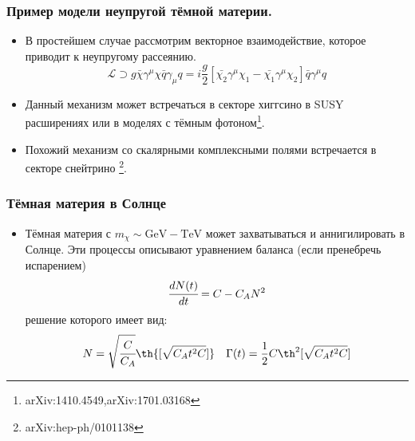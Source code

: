 \documentclass[
11pt,]{beamer}
\newcommand{\tderiv}[1]{\cfrac{d #1}{d t}}
\begin{document}
	\begin{frame}
		\frametitle{Пример модели неупругой тёмной материи.}
		\begin{itemize}
	\item В простейшем случае рассмотрим векторное взаимодействие, которое приводит к неупругому рассеянию.
	\begin{equation*} 
		\mathcal{L} \supset g\bar{\chi}\gamma^{\mu}\chi \bar{q}\gamma_{\mu}q = i\frac{g}{2}
		\left[ \bar{\chi_2}\gamma^{\mu}\chi_1  -  \bar{\chi_1}\gamma^{\mu}\chi_2\right]\bar{q}\gamma^{\mu}q
	\end{equation*}  
	\item Данный механизм может встречаться в секторе хиггсино в SUSY расширениях или в моделях с тёмным фотоном\footnote{arXiv:1410.4549,arXiv:1701.03168}.
	\item Похожий механизм со скалярными комплексными полями встречается в секторе снейтрино \footnote{arXiv:hep-ph/0101138}.
\end{itemize}
	\end{frame}
	
	
	\begin{frame}
		\frametitle{Тёмная материя в Солнце}
		\begin{itemize}
	\item Тёмная материя с $m_{\chi} \sim \text{GeV} -\text{TeV} $ может захватываться и аннигилировать в Солнце. Эти процессы описывают уравнением баланса (если пренебречь испарением)
	\begin{equation*}
		\tderiv{N(t)} = C - C_A N^2
	\end{equation*}
	решение которого имеет вид:
	\begin{equation*}
		N = \sqrt{\cfrac{C}{C_A}} \th{[\sqrt{C_A t^2C}]} \quad
		\Gamma(t) = \frac{1}{2} C \th^2{[\sqrt{C_A t^2C}]}
		\label{eq:AnnNtherm}
	\end{equation*}
 
\end{itemize}
	\end{frame}
	
\end{document}
